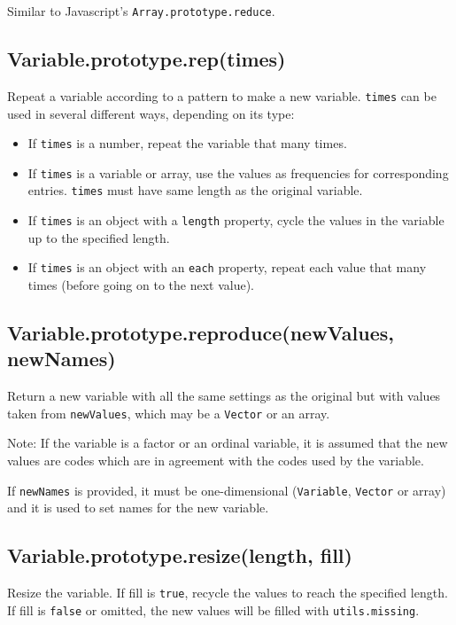 \documentclass{article}
\begin{document}
Similar to Javascript's \texttt{Array.prototype.reduce}.


    \subsection*{Variable.prototype.rep(times)}
    Repeat a variable according to a pattern to make a new variable.
\texttt{times} can be used in several different ways, depending on its type:


\begin{itemize}

\item If \texttt{times} is a number, repeat the variable that many times.

\item If \texttt{times} is a variable or array, use the values as frequencies for
corresponding entries. \texttt{times} must have same length as the original variable.

\item If \texttt{times} is an object with a \texttt{length} property, cycle the values in the
variable up to the specified length.

\item If \texttt{times} is an object with an \texttt{each} property, repeat each value that
many times (before going on to the next value).

\end{itemize}

    \subsection*{Variable.prototype.reproduce(newValues, newNames)}
    Return a new variable with all the same settings as the original
but with values taken from \texttt{newValues}, which may be
a \texttt{Vector} or an array.


Note: If the variable is a factor or an ordinal variable, it is
assumed that the new values are codes which are in agreement
with the codes used by the variable.


If \texttt{newNames} is provided, it must be one-dimensional (\texttt{Variable}, \texttt{Vector}
or array) and it is used to set names for the new variable.


    \subsection*{Variable.prototype.resize(length, fill)}
    Resize the variable.
If fill is \texttt{true}, recycle the values to reach the specified length.
If fill is \texttt{false} or omitted, the new values will be filled with \texttt{utils.missing}.
\end{document}
